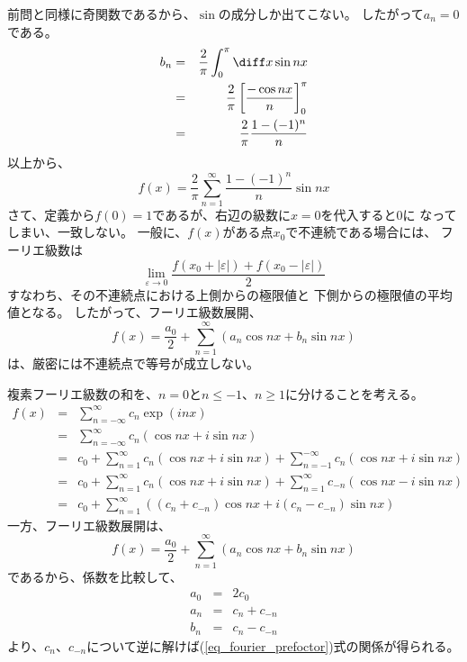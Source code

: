 前問と同様に奇関数であるから、$\sin$の成分しか出てこない。
したがって$a_n=0$である。
\begin{eqnarray}
  b_n &=& \frac{2}{\pi} \int_0^{\pi} \diff x  \sin nx\\
  &=& \frac{2}{\pi}  \left[ \frac{- \cos nx}{n}  \right]_0^\pi\\
  &=& \frac{2}{\pi} \frac{1 - (-1)^n}{n}
\end{eqnarray}
以上から、
\begin{equation}
  f(x) = \frac{2}{\pi} \sum_{n=1}^{\infty} \frac{1 - (-1)^n}{n} \sin nx
\end{equation}
さて、定義から$f(0) = 1$であるが、右辺の級数に$x=0$を代入すると$0$に
なってしまい、一致しない。
一般に、$f(x)$がある点$x_0$で不連続である場合には、
フーリエ級数は
\begin{equation}
  \lim_{\varepsilon \rightarrow 0} \frac{f(x_0 + |\varepsilon|) + f(x_0 - |\varepsilon|) }{2}
\end{equation}
すなわち、その不連続点における上側からの極限値と
下側からの極限値の平均値となる。
したがって、フーリエ級数展開、
\begin{equation}
  f(x) = \frac{a_0}{2} + \sum_{n=1}^\infty (a_n \cos nx + b_n \sin nx)
\end{equation}
は、厳密には不連続点で等号が成立しない。

複素フーリエ級数の和を、$n=0$と$n\le -1$、$n \ge 1$に分けることを考える。
\begin{eqnarray}
  f(x) &=& \sum_{n=-\infty}^{\infty} c_n \exp{(inx)}\\
  &=& \sum_{n=-\infty}^{\infty} c_n (\cos nx + i \sin nx)\\
  &=& c_0 + \sum_{n=1}^{\infty} c_n (\cos nx + i \sin nx)
  + \sum_{n=-1}^{-\infty} c_n (\cos nx + i \sin nx)\\
  &=& c_0 + \sum_{n=1}^{\infty} c_n (\cos nx + i \sin nx)
  + \sum_{n=1}^{\infty} c_{-n} (\cos nx - i \sin nx)\\
  &=& c_0 + \sum_{n=1}^{\infty} \left( (c_n+c_{-n}) \cos nx + i(c_n-c_{-n}) \sin nx  \right)
\end{eqnarray}
一方、フーリエ級数展開は、
\begin{equation}
  f(x) = \frac{a_0}{2} + \sum_{n=1}^{\infty} \left( a_n \cos nx + b_n \sin nx  \right)
\end{equation}
であるから、係数を比較して、
\begin{eqnarray}
  a_0 &=& 2 c_0 \\
  a_n &=& c_n + c_{-n} \\
  b_n &=& c_n - c_{-n}
\end{eqnarray}
より、$c_n$、$c_{-n}$について逆に解けば(\ref{eq_fourier_prefoctor})式の関係が得られる。

